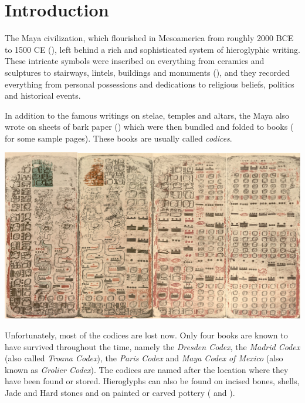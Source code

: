 \documentclass[../main.tex]{subfiles}
\begin{document}
\chapter{Introduction}
The Maya civilization, which flourished in Mesoamerica from roughly 2000 BCE to 1500 CE 
(\cite[3]{estrada-belli2011}), 
left behind a rich and sophisticated system of hieroglyphic writing. 
These intricate symbols were inscribed on everything from ceramics and sculptures to stairways,
lintels, buildings and monuments (\cite[\ppno~17--27]{thompson1962}), and they recorded everything 
from personal possessions and dedications to religious beliefs, politics and historical events.

In addition to the famous writings on stelae, temples and altars, the Maya also wrote on sheets of 
bark paper (\cite[34\psq]{vonhagen1944}) which were then bundled and 
folded to books ( for some sample pages).
These books are usually called \emph{codices}.
\begin{center}
    \includegraphics[width=\textwidth,keepaspectratio]{img/example-dresden-codex}
    \label{fig:introduction-example-dresden-codex}
\end{center}
Unfortunately, most of the codices are lost now.
Only four books are known to have survived throughout the time, 
namely the \emph{Dresden Codex}, the \emph{Madrid Codex} (also called \emph{Troana Codex}),
the \emph{Paris Codex} and \emph{Maya Codex of Mexico} (also known as \emph{Grolier Codex}).
The codices are named after the location where they have been found or stored.
Hieroglyphs can also be found on incised bones, shells, Jade and Hard stones and on painted or 
carved pottery ( and
).
\end{document}
